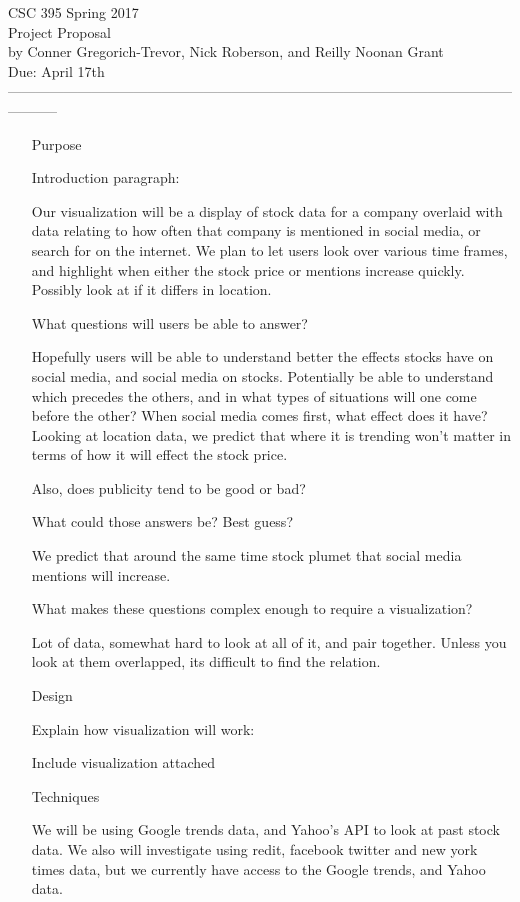 \documentclass[12pt]{article}
\begin{document}
\begin{center} 
  CSC 395 Spring 2017 \\
  Project Proposal\\
  by Conner Gregorich-Trevor, Nick Roberson, and Reilly Noonan Grant\\
  Due: April 17th \\

----------------------------------------------------------------------------------------------------------------------- \end{center}

\begin{enumerate}
  \item[Purpose] 
    
    Introduction paragraph:
    
    Our visualization will be a display of stock data for a company
    overlaid with data relating to how often that company is mentioned
    in social media, or search for on the internet. We plan to let
    users look over various time frames, and highlight when either the
    stock price or mentions increase quickly. Possibly look at if it
    differs in location.

    What questions will users be able to answer?
    
    Hopefully users will be able to understand better the effects
    stocks have on social media, and social media on
    stocks. Potentially be able to understand which precedes the
    others, and in what types of situations will one come before the
    other? When social media comes first, what effect does it have?
    Looking at location data, we predict that where it is trending
    won't matter in terms of how it will effect the stock price.

    Also, does publicity tend to be good or bad?

    What could those answers be? Best guess?
    
    We predict that around the same time stock plumet that social
    media mentions will increase.

    What makes these questions complex enough to require a
    visualization?

    Lot of data, somewhat hard to look at all of it, and pair
    together. Unless you look at them overlapped, its difficult to
    find the relation.
    
  \item[Design]
    
    Explain how visualization will work:


    Include visualization attached

  \item[Techniques]

    We will be using Google trends data, and Yahoo's API to look at
    past stock data. We also will investigate using redit, facebook
    twitter and new york times data, but we currently have access to the Google
    trends, and Yahoo data.

\end{enumerate}
\end{document}
